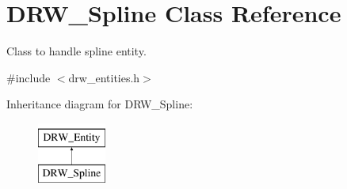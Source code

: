 \hypertarget{class_d_r_w___spline}{}\section{D\+R\+W\+\_\+\+Spline Class Reference}
\label{class_d_r_w___spline}


Class to handle spline entity.  




{\ttfamily \#include $<$drw\+\_\+entities.\+h$>$}

Inheritance diagram for D\+R\+W\+\_\+\+Spline\+:\begin{figure}[H]
\begin{center}
\leavevmode
\includegraphics[height=2.000000cm]{d4/d9c/class_d_r_w___spline}
\end{center}
\end{figure}
